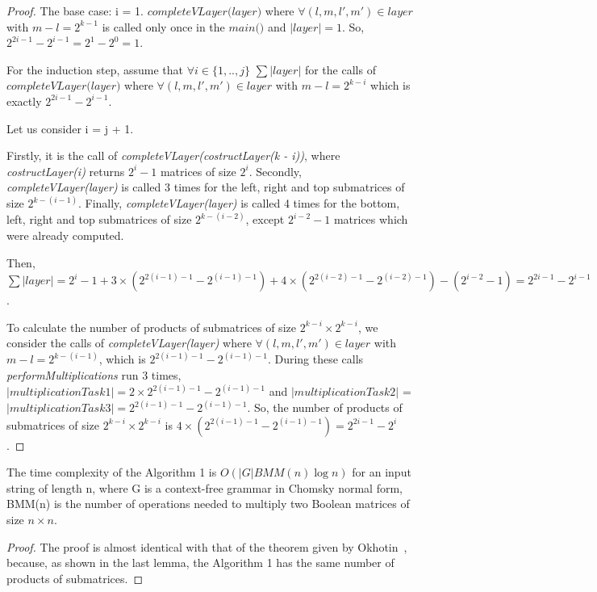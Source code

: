 \begin{proof}
The base case: i = 1. $\textit{completeVLayer(layer)}$ where $\forall (l, m, l', m') \in layer$ with $m - l = 2^{k - 1}$ is called only once in the  $\textit{main()}$ and $|layer| = 1$. So, $2^{2i - 1} - 2^{i - 1} = 2^1 - 2^0 = 1$.

For the induction step, assume that $\forall i \in \{ 1, .., j\}$ $\sum{|layer|}$ for the calls of $\textit{completeVLayer(layer)}$ where $\forall (l, m, l', m') \in layer$ with $m - l = 2^{k - i}$  which is exactly $2^{2i - 1} - 2^{i - 1}$.

Let us consider i = j + 1.

Firstly, it is the call of \textit{completeVLayer(costructLayer(k - i))}, where \textit{costructLayer(i)} returns $2^i - 1$ matrices of size $2^i$. Secondly, \textit{completeVLayer(layer)} is called 3 times for the left, right and top submatrices of size $2^{k - (i - 1)}$. Finally, \textit{completeVLayer(layer)} is called 4 times for the bottom, left, right and top submatrices of size $2^{k - (i - 2)}$, except $2^{i - 2} - 1$ matrices which were already computed.

Then, $\sum{|layer|} = 2^{i} - 1 + 3 \times (2^{2(i - 1) - 1} - 2^{(i - 1) - 1}) + 4 \times (2^{2(i - 2) - 1} - 2^{(i - 2) - 1}) - (2^{i - 2} - 1) = 2^{2i - 1} - 2^{i - 1}$.

To calculate the number of products of submatrices of size $2^{k - i} \times 2^{k - i}$, we consider the calls of \textit{completeVLayer(layer)} where $\forall (l, m, l', m') \in layer$ with $m - l = 2^{k - (i - 1)}$, which is $2^{2(i - 1) - 1} - 2^{(i - 1) - 1}$. During these calls \textit{performMultiplications} run 3 times, $|multiplicationTask1| = 2 \times 2^{2(i - 1) - 1} - 2^{(i - 1) - 1}$ and \linebreak $|multiplicationTask2|$ = $|multiplicationTask3| = 2^{2(i - 1) - 1} - 2^{(i - 1) - 1}$. So, the number of products of submatrices of size $2^{k - i} \times 2^{k - i}$ is $4 \times (2^{2(i - 1) - 1} - 2^{(i - 1) - 1}) = 2^{2i - 1} - 2^{i}$.
\end{proof}

\begin{theorem}
The time complexity of the Algorithm 1 is $O(|G|BMM(n)\log{n})$ for an input string of length n, where G is a context-free grammar in Chomsky normal form, BMM(n) is the number of operations needed to multiply two Boolean matrices of size $n \times n$.
\end{theorem}

\begin{proof}
The proof is almost identical with that of the theorem given by Okhotin~\cite{okhotin}, because, as shown in the last lemma, the Algorithm 1 has the same number of products of submatrices.
\end{proof}

